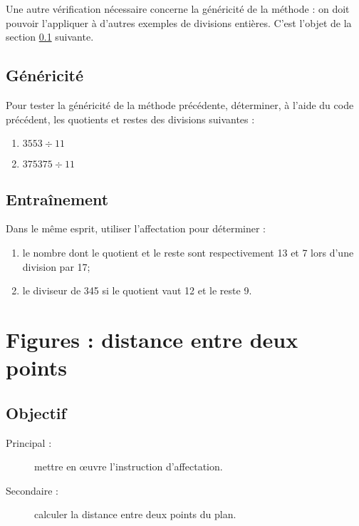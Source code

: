 Une autre vérification nécessaire concerne la généricité de la méthode : 
on doit pouvoir l'appliquer à d'autres exemples de divisions entières.
C'est l'objet de la section \ref{affectation:nombres:genericite} suivante.

\subsection{Généricité}\label{affectation:nombres:genericite}
Pour tester la généricité de la méthode précédente, déterminer, à l'aide du code \python{} précédent, 
les quotients et restes des divisions suivantes :
\begin{enumerate}
\item $3553 \div 11$
\item $375375 \div 11$
\end{enumerate}

\subsection{Entraînement}\label{affectation:nombres:entrainement}
Dans le même esprit, utiliser l'affectation pour déterminer :
\begin{enumerate}
\item le nombre dont le quotient et le reste sont respectivement 13 et 7 
	lors d'une division par 17;
\item le diviseur de 345 si le quotient vaut 12 et le reste 9.
\end{enumerate}

\section{Figures : distance entre deux points}\label{affectation:figures}

\subsection{Objectif}\label{affectation:figures:objectif}
\begin{description}
\item[Principal : ] mettre en \oe uvre l'instruction d'affectation.
\item[Secondaire :] calculer la distance entre deux points du plan.
\end{description}

